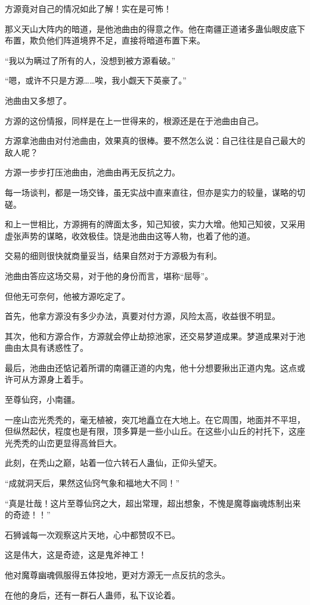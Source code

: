 \begin{this_body}
方源竟对自己的情况如此了解！实在是可怖！

那义天山大阵内的暗道，是他池曲由的得意之作。他在南疆正道诸多蛊仙眼皮底下布置，欺负他们阵道境界不足，直接将暗道布置下来。

“我以为瞒过了所有的人，没想到被方源看破。”

“嗯，或许不只是方源……唉，我小觑天下英豪了。”

池曲由又多想了。

方源的这份情报，同样是在上一世得来的，根源还是在于池曲由自己。

方源拿池曲由对付池曲由，效果真的很棒。要不然怎么说：自己往往是自己最大的敌人呢？

方源一步步打压池曲由，池曲由再无反抗之力。

每一场谈判，都是一场交锋，虽无实战中直来直往，但亦是实力的较量，谋略的切磋。

和上一世相比，方源拥有的牌面太多，知己知彼，实力大增。他知己知彼，又采用虚张声势的谋略，收效极佳。饶是池曲由这等人物，也着了他的道。

交易的细则很快就商量妥当，结果自然对于方源极为有利。

池曲由答应这场交易，对于他的身份而言，堪称“屈辱”。

但他无可奈何，他被方源吃定了。

首先，他拿方源没有多少办法，真要对付方源，风险太高，收益很不明显。

其次，他和方源合作，方源就会停止劫掠池家，还交易梦道成果。梦道成果对于池曲由太具有诱惑性了。

最后，池曲由还惦记着所谓的南疆正道的内鬼，他十分想要揪出正道内鬼。这点或许可从方源身上着手。

至尊仙窍，小南疆。

一座山峦光秃秃的，毫无植被，突兀地矗立在大地上。在它周围，地面并不平坦，但纵然起伏，程度也是有限，顶多算是一些小山丘。在这些小山丘的衬托下，这座光秃秃的山峦更显得高耸巨大。

此刻，在秃山之巅，站着一位六转石人蛊仙，正仰头望天。

“成就洞天后，果然这仙窍气象和福地大不同！”

“真是壮哉！这片至尊仙窍之大，超出常理，超出想象，不愧是魔尊幽魂炼制出来的奇迹！！”

石狮诚每一次观察这片天地，心中都赞叹不已。

这是伟大，这是奇迹，这是鬼斧神工！

他对魔尊幽魂佩服得五体投地，更对方源无一点反抗的念头。

在他的身后，还有一群石人蛊师，私下议论着。


\end{this_body}
